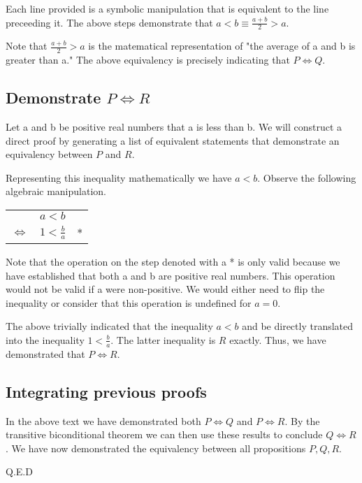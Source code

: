 Each line provided is a symbolic manipulation that is equivalent to the line preceeding it. The above steps demonstrate that $a < b \equiv \frac{a + b}{2} > a$.

Note that $\frac{a + b}{2} > a$ is the matematical representation of "the average of a and b is greater than a." The above equivalency is precisely indicating that $P \iff Q$.

\subsection{Demonstrate $P \iff R$}
Let a and b be positive real numbers that a is less than b. We will construct a direct proof by generating a list of equivalent statements that demonstrate an equivalency between $P$ and $R$.

Representing this inequality mathematically we have $a < b$. Observe the following algebraic manipulation.

\begin{center}
  \begin{tabular}{cll}
    & $a < b$ \\
    $\iff$ & $1 < \frac{b}{a}$ & *
  \end{tabular}
\end{center}

Note that the operation on the step denoted with a * is only valid because we have established that both a and b are positive real numbers. This operation would not be valid if a were non-positive. We would either need to flip the inequality or consider that this operation is undefined for $a=0$.

The above trivially indicated that the inequality $a < b$ and be directly translated into the inequality $1 < \frac{b}{a}$. The latter inequality is $R$ exactly. Thus, we have demonstrated that $P \iff R$.

\subsection{Integrating previous proofs}
In the above text we have demonstrated both $P \iff Q$ and $P \iff R$. By the transitive biconditional theorem we can then use these results to conclude $Q \iff R$. We have now demonstrated the equivalency between all propositions $P,Q,R$.

Q.E.D


